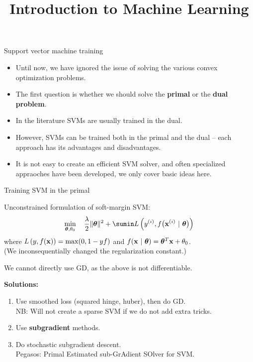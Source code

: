 \documentclass[11pt,compress,t,notes=noshow, xcolor=table]{beamer}
\title{Introduction to Machine Learning}
\begin{document}

\begin{vbframe}{Support vector machine training}

  \begin{itemize}
    \item Until now, we have ignored the issue of solving the
    various convex optimization problems.
    \item The first question is whether we should solve the \textbf{primal} or the \textbf{dual problem}.
    \item In the literature SVMs are usually trained in the dual.
    \item However, SVMs can be trained both in the primal and the dual -- each approach has its advantages and disadvantages.
    \item It is not easy to create an efficient SVM solver, and often specialized appraoches have been developed, 
      we only cover basic ideas here.
  \end{itemize}

\end{vbframe}

\begin{vbframe}{Training SVM in the primal}

Unconstrained formulation of soft-margin SVM:
$$
\min\limits_{\thetav, \theta_0} \quad \frac{\lambda}{2} \|\thetav\|^2 + \sumin \Lxyit
$$
where $L\left(y, f(\mathbf{x})\right) = \max(0, 1 -  y f)$ and $f(\mathbf{x} ~|~ \bm{\theta}) = \bm{\theta}^T \mathbf{x} + \theta_0$.\\ 
(We inconsequentially changed the regularization constant.)

\vspace*{2mm}

We cannot directly use GD, as the above is not differentiable.

\vspace*{2mm}

\textbf{Solutions:}
\begin{enumerate}
\item Use smoothed loss (squared hinge, huber), then do GD.\\
  NB: Will not  create a sparse SVM if we do not add extra tricks.
\item Use \textbf{subgradient} methods.
\item Do stochastic subgradient descent.\\
  Pegasos: Primal Estimated sub-GrAdient SOlver for SVM.
\end{enumerate}
\end{vbframe}
\end{document}
